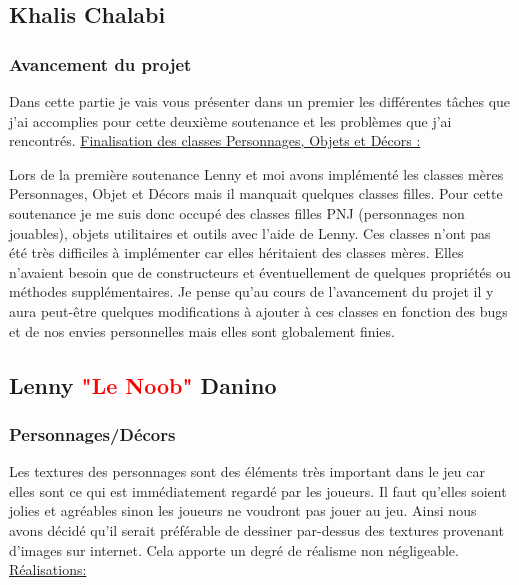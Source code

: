 \documentclass{article}
\begin{document}
\newpage

\subsection{Khalis Chalabi}

\subsubsection{Avancement du projet}

\par
Dans cette partie je vais vous présenter dans un premier les différentes tâches que j'ai accomplies pour cette deuxième  soutenance et les problèmes que j'ai rencontrés.
\newline
\newline
\underline{Finalisation des classes Personnages, Objets et Décors :}

\par
Lors de la première soutenance Lenny et moi avons implémenté les classes mères Personnages, Objet et Décors mais il manquait quelques classes filles. Pour cette soutenance je me suis donc occupé des classes filles PNJ (personnages non jouables), objets utilitaires et outils avec l’aide de Lenny. Ces classes n’ont pas été très difficiles à implémenter car elles héritaient des classes mères. Elles n’avaient besoin que de constructeurs et éventuellement de quelques propriétés ou méthodes supplémentaires. Je pense qu’au cours de l’avancement du projet il y aura peut-être quelques modifications à ajouter à ces classes en fonction des bugs et de nos envies personnelles mais elles sont globalement finies.

\subsection{Lenny \textcolor{red}{"Le Noob"} Danino}
\subsubsection{Personnages/Décors}

\par
Les textures des personnages sont des éléments très important dans le jeu car elles sont ce qui est immédiatement regardé par les joueurs. Il faut qu’elles soient jolies et agréables sinon les joueurs ne voudront pas jouer au jeu. Ainsi nous avons décidé qu’il serait préférable de dessiner par-dessus des textures provenant d’images sur internet. Cela apporte un degré de réalisme non négligeable.
\newline
\newline
\underline{Réalisations:}
\end{document}
